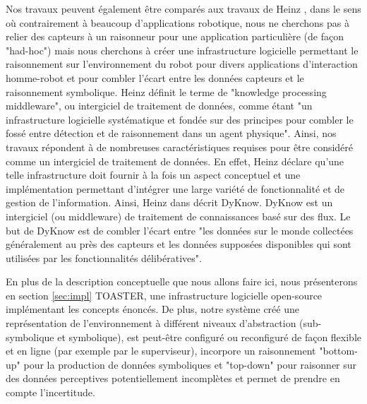 \documentclass[a4paper,11pt,twoside]{StyleThese}
\begin{document}

Nos travaux peuvent également être comparés aux travaux de Heinz \cite{heintz2009dyknow}, dans le sens où contrairement à beaucoup d'applications robotique, nous ne cherchons pas à relier des capteurs à un raisonneur pour une application particulière (de façon "had-hoc") mais nous cherchons à créer une infrastructure logicielle permettant le raisonnement sur l'environnement du robot pour divers applications d'interaction homme-robot et pour combler l'écart entre les données capteurs et le raisonnement symbolique. Heinz définit le terme de "knowledge processing middleware"\cite{heintz2008knowledge}, ou intergiciel de traitement de données, comme étant "un infrastructure logicielle systématique et fondée sur des principes pour combler le fossé entre détection et de raisonnement dans un agent physique". Ainsi, nos travaux répondent à de nombreuses caractéristiques requises pour être considéré comme un intergiciel de traitement de données. En effet, Heinz déclare qu'une telle infrastructure doit fournir à la fois un aspect conceptuel et une implémentation permettant d'intégrer une large variété de fonctionnalité et de gestion de l'information. Ainsi, Heinz dans \cite{heintz2010bridging} décrit DyKnow. DyKnow est un intergiciel (ou middleware) de traitement de connaissances basé sur des flux. Le but de DyKnow est de combler l'écart entre "les données sur le monde collectées généralement au près des capteurs et les données supposées disponibles qui sont utilisées par les fonctionnalités délibératives".

En plus de la description conceptuelle que nous allons faire ici, nous présenterons en section \ref{sec:impl} TOASTER, une infrastructure logicielle open-source implémentant les concepts énoncés. De plus, notre système créé une représentation de l'environnement à différent niveaux d'abstraction (sub-symbolique et symbolique), est peut-être configuré ou reconfiguré de façon flexible et en ligne (par exemple par le superviseur), incorpore un raisonnement "bottom-up" pour la production de données symboliques et "top-down" pour raisonner sur des données perceptives potentiellement incomplètes et permet de prendre en compte l'incertitude.
\end{document}
